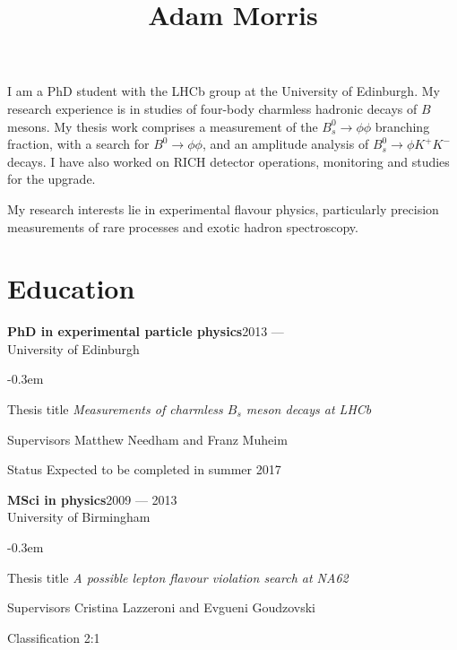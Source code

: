 \documentclass[contbibnum,titleabove]{simplecv}
\title{Adam Morris}
\newcommand\dateditem[2]{#1\hfill#2\\}
\newcommand\topictitle[3]{\dateditem{{\textbf{#1}}}{#3}#2}
\def\typeface{phv}
\begin{document}
	\maketitle
	\fontfamily{\typeface}\selectfont
	I am a PhD student with the LHCb group at the University of Edinburgh.
	My research experience is in studies of four-body charmless hadronic decays of $B$ mesons.
	My thesis work comprises a measurement of the $B^0_s \to \phi \phi$ branching fraction, with a search for $B^0 \to \phi \phi$, and an amplitude analysis of $B^0_s \to \phi K^{+}K^{-}$ decays.
	I have also worked on RICH detector operations, monitoring and studies for the upgrade.
	
	My research interests lie in experimental flavour physics, particularly precision measurements of rare processes and exotic hadron spectroscopy.
	\section{Education}
	\topictitle{PhD in experimental particle physics}{University of Edinburgh}{2013 ---}
	\begin{topic}
		\itemsep-0.3em
		\item[Thesis title]{\textit{Measurements of charmless $B_s$ meson decays at LHCb}}
		\item[Supervisors]{Matthew Needham and Franz Muheim}
		\item[Status]{Expected to be completed in summer 2017}
	\end{topic}
	\topictitle{MSci in physics}{University of Birmingham}{2009 --- 2013}
	\begin{topic}
		\itemsep-0.3em
		\item[Thesis title]{\textit{A possible lepton flavour violation search at NA62}}
		\item[Supervisors]{Cristina Lazzeroni and Evgueni Goudzovski}
		\item[Classification]{2:1}
	\end{topic}
\end{document}
